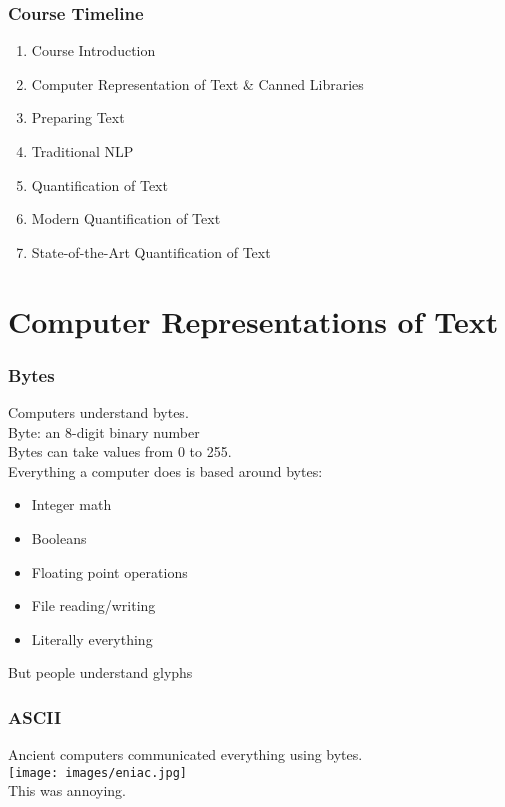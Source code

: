 \documentclass[smaller,xcolor=table,aspectratio=169]{beamer}
\begin{document}
\begin{frame}
  \frametitle{Course Timeline}
  \begin{enumerate}
    \item Course Introduction
    \item Computer Representation of Text \& Canned Libraries
    \item Preparing Text
    \item Traditional NLP
    \item Quantification of Text
    \item Modern Quantification of Text
    \item State-of-the-Art Quantification of Text
  \end{enumerate}
\end{frame}

\section{Computer Representations of Text}

\begin{frame}
  \frametitle{Bytes}
  Computers understand bytes.\\\pause{}
  Byte: an 8-digit binary number\\\pause{}
  Bytes can take values from 0 to 255.\\\pause{}
  Everything a computer does is based around bytes:\\\pause{}
  \begin{itemize}
    \item Integer math
    \item Booleans
    \item Floating point operations
    \item File reading/writing
    \item Literally everything
  \end{itemize}
  But people understand glyphs
\end{frame}

\begin{frame}
  \frametitle{ASCII}
  Ancient computers communicated everything using bytes.\\
  \texttt{[image: images/eniac.jpg]}\pause{}\\
  This was annoying.
\end{frame}
\end{document}
